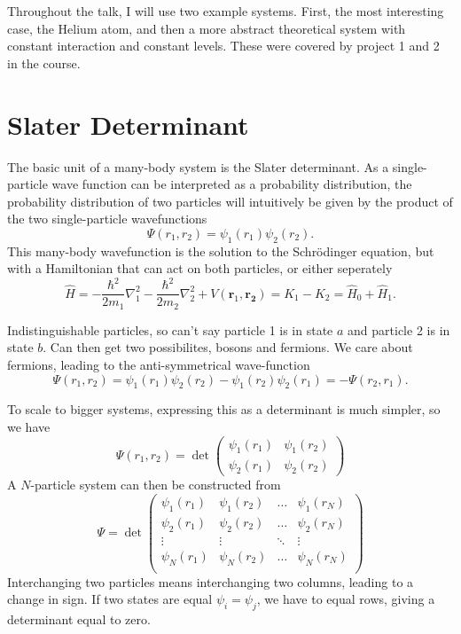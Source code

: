 \documentclass[a4paper, 11pt, notitlepage, english]{article}
\newcommand{\op}[1]{\hat{#1}}
\newcommand{\bt}[1]{\boldsymbol{#1}}
\begin{document}
Throughout the talk, I will use two example systems. First, the most interesting case, the Helium atom, and then a more abstract theoretical system with constant interaction and constant levels. These were covered by project 1 and 2 in the course.


\section*{Slater Determinant}

The basic unit of a many-body system is the Slater determinant. As a single-particle wave function can be interpreted as a probability distribution, the probability distribution of two particles will intuitively be given by the product of the two single-particle wavefunctions
$$\Psi(r_1, r_2) = \psi_1(r_1)\psi_2(r_2).$$
This many-body wavefunction is the solution to the Schrödinger equation, but with a Hamiltonian that can act on both particles, or either seperately
$$\op{H} = -\frac{\hbar^2}{2m_1}\nabla_1^2 - \frac{\hbar^2}{2m_2}\nabla^2_2 + V(\bt{r}_1, \bt{r_2}) = K_1 - K_2 = \op{H}_0 + \op{H}_1.$$

Indistinguishable particles, so can't say particle 1 is in state $a$ and particle 2 is in state $b$. Can then get two possibilites, bosons and fermions. We care about fermions, leading to the anti-symmetrical wave-function
$$\Psi(r_1, r_2) = \psi_1(r_1)\psi_2(r_2) - \psi_1(r_2)\psi_2(r_1) = - \Psi(r_2, r_1).$$

To scale to bigger systems, expressing this as a determinant is much simpler, so we have
$$\Psi(r_1, r_2) = \det\begin{pmatrix}
\psi_1(r_1) & \psi_1(r_2) \\ \psi_2(r_1) & \psi_2(r_2) 	
\end{pmatrix}$$
A $N$-particle system can then be constructed from
$$\Psi = \det\begin{pmatrix}
\psi_1(r_1) & \psi_1(r_2) &  \ldots & \psi_1(r_N)  \\ 
\psi_2(r_1) & \psi_2(r_2) & \ldots  & \psi_2(r_N)  \\ 
\vdots & \vdots & \ddots & \vdots \\
\psi_N(r_1) & \psi_N(r_2) & \ldots  & \psi_N(r_N)  \\ 
\end{pmatrix}$$
Interchanging two particles means interchanging two columns, leading to a change in sign. If two states are equal $\psi_i = \psi_j$, we have to equal rows, giving a determinant equal to zero.
\end{document}
